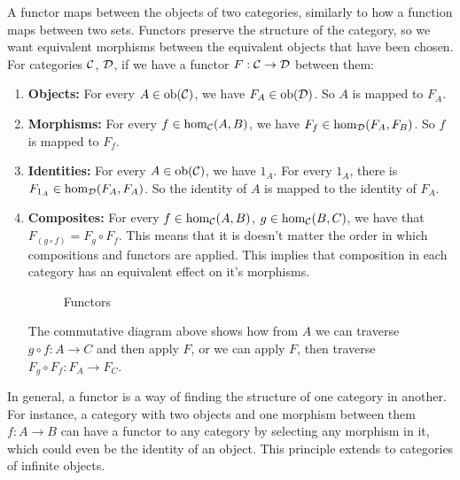 \documentclass[10pt,a4paper,reqno]{amsart}
\numberwithin{figure}{section}
\begin{document}
A functor maps between the objects of two categories, similarly to how a function maps between two sets.
Functors preserve the structure of the category, so we want equivalent morphisms between the equivalent objects that have been chosen.
For categories $\mathcal{C}$, $\mathcal{D}$, if we have a functor $F: \mathcal{C}\to\mathcal{D}$ between them:
\begin{enumerate}
        \item \textbf{Objects:} For every $A\in\operatorname{ob}(\mathcal{C})$, we have $F_A\in\operatorname{ob}(\mathcal{D})$.
        So $A$ is mapped to $F_A$.

        \item \textbf{Morphisms:} For every $f\in\hom_{\mathcal{C}}(A,B)$, we have $F_f\in\hom_{\mathcal{D}}(F_A,F_B)$.
        So $f$ is mapped to $F_f$.

        \item \textbf{Identities:} For every $A\in\operatorname{ob}(\mathcal{C})$, we have $1_A$. For every $1_A$, there is $F_{1_A}\in\hom_{\mathcal{D}}(F_A,F_A)$.
        So the identity of $A$ is mapped to the identity of $F_A$.

        \item \textbf{Composites:} For every $f\in\hom_{\mathcal{C}}(A,B)$, $g\in\hom_{\mathcal{C}}(B,C)$, we have that $F_{(g\circ f)} = F_g\circ F_f$.
        This means that it is doesn't matter the order in which compositions and functors are applied.
        This implies that composition in each category has an equivalent effect on it's morphisms.
        \begin{figure}[H]
        \caption{Functors}
        \end{figure}
        The commutative diagram above shows how from $A$ we can traverse $g\circ f: A\to C$ and then apply $F$,
        or we can apply $F$, then traverse $F_g\circ F_f: F_A\to F_C$.
        
\end{enumerate}
In general, a functor is a way of finding the structure of one category in another.
For instance, a category with two objects and one morphism between them $f: A\to B$
can have a functor to any category by selecting any morphism in it,
which could even be the identity of an object.
This principle extends to categories of infinite objects.
\end{document}

